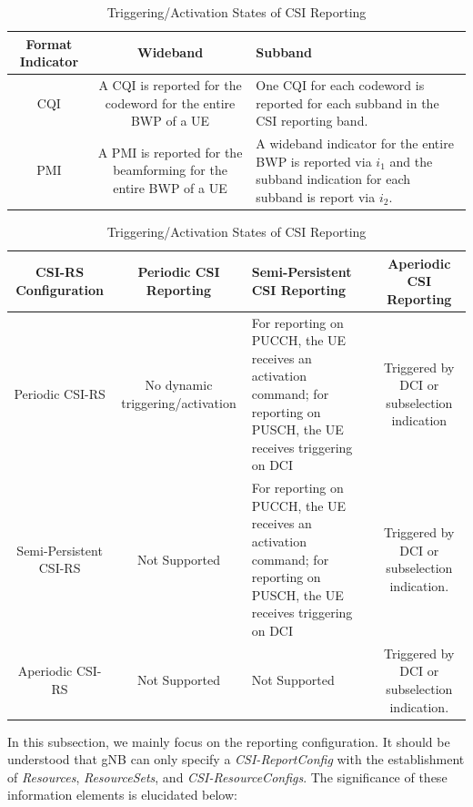 \documentclass[lettersize,journal]{IEEEtran}
\begin{document}
\begin{appendices}
\begin{table}[t]   
\begin{center}  
\captionsetup{
  labelsep=newline, %
}
\renewcommand{\arraystretch}{1.5}  %
\caption{Reporting Granularity: Wideband vs Subband} \label{granularity}
\begin{tabular}{|c|c|>{\centering\arraybackslash}m{5.2cm}|}   
\hline   \textbf{Format Indicator} & \textbf{Wideband} & \textbf{Subband}\\  
\hline   CQI & A CQI is reported for the codeword for the entire BWP of a UE &One CQI for each codeword is reported for each subband in the CSI reporting band.  \\
\hline   PMI & A PMI is reported for the beamforming for the entire BWP of a UE&A wideband indicator for the entire BWP is reported via $i_1$ and the subband indication for each subband is report via $i_2$. \\
\hline 
\end{tabular}   
\vspace{10pt}

\caption{Triggering/Activation States of CSI Reporting}\label{trigger}
\begin{tabular}{|c|c|>{\centering\arraybackslash}m{5cm}|c|}   
\hline   \textbf{CSI-RS Configuration} & \textbf{Periodic CSI Reporting} & \textbf{Semi-Persistent CSI Reporting} & \textbf{Aperiodic CSI Reporting}\\  
\hline   Periodic CSI-RS & No dynamic  triggering/activation &For reporting on PUCCH, the UE receives an activation command; for reporting on PUSCH, the UE receives triggering on DCI & Triggered by DCI or subselection indication \\
\hline   Semi-Persistent CSI-RS & Not Supported &For reporting on PUCCH, the UE receives an activation command; for reporting on PUSCH, the UE receives triggering on DCI & Triggered by DCI or subselection indication.\\
\hline   Aperiodic CSI-RS & Not Supported &Not Supported & Triggered by DCI or subselection indication.\\     
\hline 
\end{tabular}   
\end{center}   
\vspace{-12pt}
\end{table}



In this subsection, we mainly focus on the reporting configuration. It should be understood that gNB can only specify a \emph{CSI-ReportConfig} with the establishment of \emph{Resources}, \emph{ResourceSets}, and \emph{CSI-ResourceConfigs}. The significance of these information elements is elucidated below:


\end{appendices}
\end{document}
